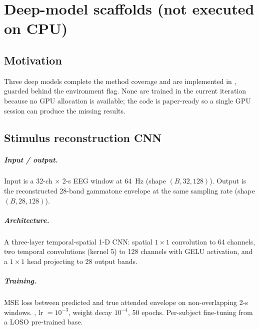 \chapter{Deep-model scaffolds (not executed on CPU)}
\label{ch:deep-stubs}

\section{Motivation}

Three deep models complete the method coverage and are implemented in
, guarded behind the
 environment flag. None are trained in the current
iteration because no GPU allocation is available; the code is paper-ready
so a single GPU session can produce the missing results.

\section{Stimulus reconstruction CNN}

\paragraph{Input / output.} Input is a 32-ch $\times$ 2-s EEG window
at \SI{64}{\hertz} (shape $(B, 32, 128)$). Output is the reconstructed
28-band gammatone envelope at the same sampling rate (shape
$(B, 28, 128)$).

\paragraph{Architecture.} A three-layer temporal-spatial 1-D CNN:
spatial $1 \times 1$ convolution to 64 channels, two temporal
convolutions (kernel 5) to 128 channels with GELU activation, and a
$1 \times 1$ head projecting to 28 output bands.

\paragraph{Training.} MSE loss between predicted and true attended
envelope on non-overlapping 2-s windows. , lr $= 10^{-3}$,
weight decay $10^{-4}$, 50 epochs. Per-subject fine-tuning from a
LOSO pre-trained base.

